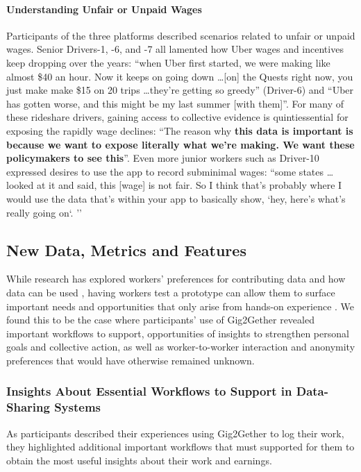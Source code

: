 \paragraph{\textbf{Understanding Unfair or Unpaid Wages}}
Participants of the three platforms described scenarios related to unfair or unpaid wages. Senior Drivers-1, -6, and -7 all lamented how Uber wages and incentives keep dropping over the years: ``when Uber first started, we were making like almost \$40 an hour. Now it keeps on going down \dots [on] the Quests right now, you just make make \$15 on 20 trips \dots they're getting so greedy'' (Driver-6) and ``Uber has gotten worse, and this might be my last summer [with them]''. For many of these rideshare drivers, gaining access to collective evidence is quintiessential for exposing the rapidly wage declines: ``The reason why \textbf{this data is important is because we want to expose literally what we're making. We want these policymakers to see this}''. Even more junior workers such as Driver-10 expressed desires to use the app to record subminimal wages: ``some states \dots looked at it and said, this [wage] is not fair. So I think that's probably where I would use the data that's within your app to basically show, `hey, here's what's really going on`. ''



\subsection{New Data, Metrics and Features}\label{Findings_Improvement}
{While research has explored workers' preferences for contributing data and how data can be used \cite{uuapp, supporting}, having workers test a prototype can allow them to surface important needs and opportunities that only arise from hands-on experience \cite{rogers2007s}. We found this to be the case where participants' use of Gig2Gether revealed important workflows to support, opportunities of insights to strengthen personal goals and collective action, as well as worker-to-worker interaction and anonymity preferences that would have otherwise remained unknown.} %

\subsubsection{{Insights About Essential Workflows to Support in Data-Sharing Systems}}

{As participants described their experiences using Gig2Gether to log their work, they highlighted additional important workflows that must supported for them to obtain the most useful insights about their work and earnings.}

